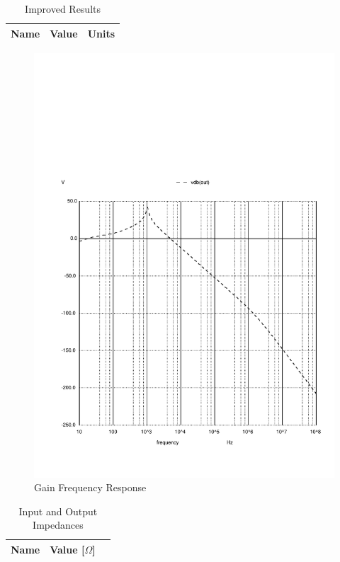 \begin{table}[h]
    \centering
    \begin{tabular}{|l|c|c|}
    \hline
    {\bf Name} & {\bf Value} & {\bf Units} \\ \hline
    
    \end{tabular}
    \caption[Improved Results]{Improved Results \footnotemark}
    \label{tab:results_new}
\end{table}
\vspace{-3 cm}
\begin{figure}[h]
    \centering
    \includegraphics[scale=0.33]{vodb_new.pdf}
    \caption{Gain Frequency Response}
    \label{fig:gain_resp_new}
\end{figure}

\begin{table}[h]
    \centering
    \begin{tabular}{|l|c|c|}
    \hline
    {\bf Name} & {\bf Value [$\Omega$]}  \\ \hline
    
    
    \end{tabular}
    \caption{Input and Output Impedances}
    \label{tab:imp_new}
\end{table}

